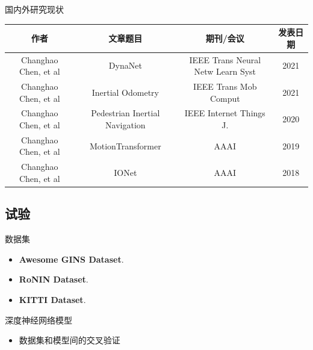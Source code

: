 \documentclass{beamer} %
\begin{document}
\begin{frame}{国内外研究现状}
    
    
    \begin{table}
    \tiny
        \begin{tabular}{cccc}
            \toprule
            作者 & 文章题目 & 期刊/会议 & 发表日期 \\
            \midrule
            Changhao Chen, et al & DynaNet\cite{chen2021dynanet} & IEEE Trans Neural Netw Learn Syst & 2021 \\
            Changhao Chen, et al & Inertial Odometry\cite{chen2021deep} & IEEE Trans Mob Comput & 2021 \\
            Changhao Chen, et al & Pedestrian Inertial Navigation\cite{chen2020deep} & IEEE Internet Things J. & 2020 \\
            Changhao Chen, et al & MotionTransformer\cite{chen2018transferring} & AAAI & 2019 \\
            Changhao Chen, et al & IONet\cite{chen2018ionet} & AAAI & 2018 \\
            \bottomrule
        \end{tabular}
    \end{table}
\end{frame}

\subsection{试验}

\begin{frame}{数据集}
    \begin{itemize}
        \item \textbf{Awesome GINS Dataset}\cite{Tang2022}.
        \item \textbf{RoNIN Dataset}\cite{herath2020ronin}.
        \item \textbf{KITTI Dataset}\cite{Geiger2013IJRR}.
    \end{itemize}
\end{frame}

\begin{frame}{深度神经网络模型}
    \begin{itemize}
        \item 数据集和模型间的交叉验证
    \end{itemize}
\end{frame}
\end{document}
